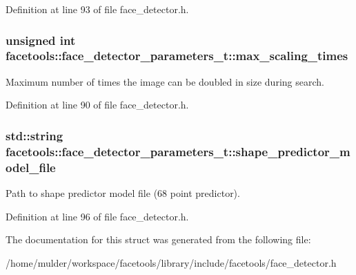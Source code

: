 Definition at line 93 of file face\+\_\+detector.\+h.

\subsubsection[{\texorpdfstring{max\+\_\+scaling\+\_\+times}{max_scaling_times}}]{\setlength{\rightskip}{0pt plus 5cm}unsigned int facetools\+::face\+\_\+detector\+\_\+parameters\+\_\+t\+::max\+\_\+scaling\+\_\+times}\hypertarget{structfacetools_1_1face__detector__parameters__t_af358725a5f3922aae3a711d3bc888471}{}\label{structfacetools_1_1face__detector__parameters__t_af358725a5f3922aae3a711d3bc888471}
Maximum number of times the image can be doubled in size during search. 

Definition at line 90 of file face\+\_\+detector.\+h.

\subsubsection[{\texorpdfstring{shape\+\_\+predictor\+\_\+model\+\_\+file}{shape_predictor_model_file}}]{\setlength{\rightskip}{0pt plus 5cm}std\+::string facetools\+::face\+\_\+detector\+\_\+parameters\+\_\+t\+::shape\+\_\+predictor\+\_\+model\+\_\+file}\hypertarget{structfacetools_1_1face__detector__parameters__t_a4596176e6dee1a3fa33e206c715c24a8}{}\label{structfacetools_1_1face__detector__parameters__t_a4596176e6dee1a3fa33e206c715c24a8}
Path to shape predictor model file (68 point predictor). 

Definition at line 96 of file face\+\_\+detector.\+h.



The documentation for this struct was generated from the following file\+:\begin{DoxyCompactItemize}
\item 
/home/mulder/workspace/facetools/library/include/facetools/face\+\_\+detector.\+h\end{DoxyCompactItemize}
